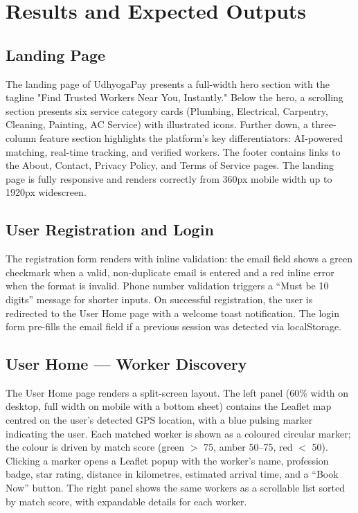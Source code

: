 \documentclass[12pt,a4paper]{report}
\begin{document}
\chapter{Results and Expected Outputs}

\section{Landing Page}

The landing page of UdhyogaPay presents a full-width hero section with the tagline "Find Trusted Workers Near You, Instantly." Below the hero, a scrolling section presents six service category cards (Plumbing, Electrical, Carpentry, Cleaning, Painting, AC Service) with illustrated icons. Further down, a three-column feature section highlights the platform's key differentiators: AI-powered matching, real-time tracking, and verified workers. The footer contains links to the About, Contact, Privacy Policy, and Terms of Service pages. The landing page is fully responsive and renders correctly from 360px mobile width up to 1920px widescreen.

\section{User Registration and Login}

The registration form renders with inline validation: the email field shows a green checkmark when a valid, non-duplicate email is entered and a red inline error when the format is invalid. Phone number validation triggers a ``Must be 10 digits'' message for shorter inputs. On successful registration, the user is redirected to the User Home page with a welcome toast notification. The login form pre-fills the email field if a previous session was detected via localStorage.

\section{User Home — Worker Discovery}

The User Home page renders a split-screen layout. The left panel (60\% width on desktop, full width on mobile with a bottom sheet) contains the Leaflet map centred on the user's detected GPS location, with a blue pulsing marker indicating the user. Each matched worker is shown as a coloured circular marker; the colour is driven by match score (green $>$ 75, amber 50--75, red $<$ 50). Clicking a marker opens a Leaflet popup with the worker's name, profession badge, star rating, distance in kilometres, estimated arrival time, and a ``Book Now'' button. The right panel shows the same workers as a scrollable list sorted by match score, with expandable details for each worker.
\end{document}
